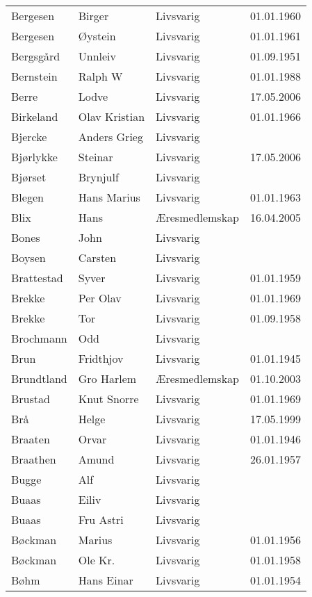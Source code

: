 \begin{longtable}{llll}
        Bergesen	&	Birger	&	Livsvarig 	&	01.01.1960	\\
        Bergesen	&	Øystein	&	Livsvarig 	&	01.01.1961	\\
        Bergsgård	&	Unnleiv	&	Livsvarig 	&	01.09.1951	\\
        Bernstein	&	Ralph W	&	Livsvarig 	&	01.01.1988	\\
        Berre	&	Lodve	&	Livsvarig	&	17.05.2006	\\
        Birkeland	&	Olav Kristian	&	Livsvarig 	&	01.01.1966	\\
        Bjercke	&	Anders Grieg	&	Livsvarig 	&		\\
        Bjørlykke	&	Steinar	&	Livsvarig	&	17.05.2006	\\
        Bjørset	&	Brynjulf	&	Livsvarig 	&		\\
        Blegen	&	Hans Marius	&	Livsvarig 	&	01.01.1963	\\
        Blix	&	Hans	&	Æresmedlemskap	&	16.04.2005	\\
        Bones	&	John	&	Livsvarig 	&		\\
        Boysen	&	Carsten	&	Livsvarig 	&		\\
        Brattestad	&	Syver	&	Livsvarig 	&	01.01.1959	\\
        Brekke	&	Per Olav	&	Livsvarig 	&	01.01.1969	\\
        Brekke	&	Tor	&	Livsvarig 	&	01.09.1958	\\
        Brochmann	&	Odd	&	Livsvarig 	&		\\
        Brun	&	Fridthjov	&	Livsvarig 	&	01.01.1945	\\
        Brundtland 	&	Gro Harlem 	&	Æresmedlemskap	&	01.10.2003	\\
        Brustad	&	Knut Snorre	&	Livsvarig 	&	01.01.1969	\\
        Brå 	&	Helge	&	Livsvarig	&	17.05.1999	\\
        Braaten	&	Orvar	&	Livsvarig 	&	01.01.1946	\\
        Braathen	&	Amund	&	Livsvarig 	&	26.01.1957	\\
        Bugge	&	Alf	&	Livsvarig 	&		\\
        Buaas	&	Eiliv	&	Livsvarig 	&		\\
        Buaas	&	Fru Astri	&	Livsvarig 	&		\\
        Bøckman	&	Marius	&	Livsvarig 	&	01.01.1956	\\
        Bøckman	&	Ole Kr. 	&	Livsvarig 	&	01.01.1958	\\
        Bøhm	&	Hans Einar	&	Livsvarig 	&	01.01.1954	\\

\end{longtable}
